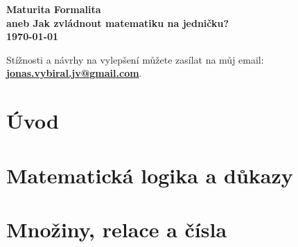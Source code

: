 \documentclass[a4paper, openany]{book}
\begin{document}
\begin{titlepage}
  \centering
  \vspace*{2cm}
  
  \textbf{\Huge Maturita Formalita}\\[0.5cm]
  
  \textbf{\Large aneb Jak zvládnout matematiku na jedničku?}\\[1.5cm]
  
  \textbf{\Large \today}

  \vfill
  Stížnosti a návrhy na vylepšení můžete zasílat na můj email: \\[0.5cm]
  \textbf{\href{mailto: jonas.vybiral.jv@gmail.com}{jonas.vybiral.jv@gmail.com}}.
\end{titlepage}

\thispagestyle{empty}

\tableofcontents

\chapter*{Úvod}
  



\chapter{Matematická logika a důkazy}


\chapter{Množiny, relace a čísla}

\end{document}
